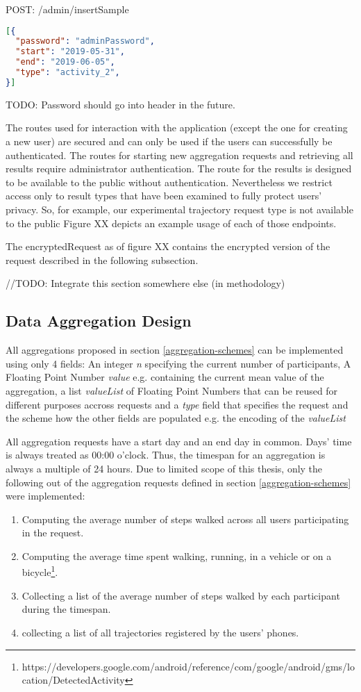 POST: /admin/insertSample
\begin{lstlisting}[language=json,firstnumber=1]
[{
  "password": "adminPassword",
  "start": "2019-05-31",
  "end": "2019-06-05",
  "type": "activity_2",
}]
\end{lstlisting}


TODO: Password should go into header in the future.

The routes used for interaction with the application (except the one for creating a new user) are secured and can only be used if the users can successfully be authenticated. The routes for starting new aggregation requests and retrieving all results require administrator authentication. The route for the results is designed to be available to the public without authentication. Nevertheless we restrict access only to result types that have been examined to fully protect users' privacy. So, for example, our experimental trajectory request type is not available to the public
Figure XX depicts an example usage of each of those endpoints.

The encryptedRequest as of figure XX contains the encrypted version of the request described in the following subsection.

//TODO: Integrate this section somewhere else (in methodology)
\subsection{Data Aggregation Design}
All aggregations proposed in section \ref{aggregation-schemes} can be implemented using only 4 fields: An integer \textit{n} specifying the current number of participants, A Floating Point Number \textit{value} e.g. containing the current mean value of the aggregation, a list \textit{valueList} of Floating Point Numbers that can be reused for different purposes accross requests and a \textit{type} field that specifies the request and the scheme how the other fields are populated e.g. the encoding of the \textit{valueList}

All aggregation requests have a start day and an end day in common. Days' time is always treated as 00:00 o'clock. Thus, the timespan for an aggregation is always a multiple of 24 hours.
Due to limited scope of this thesis, only the following out of the aggregation requests defined in section \ref{aggregation-schemes} were implemented:
\begin{enumerate}
	\item Computing the average number of steps walked across all users participating in the request.
	\item Computing the average time spent walking, running, in a vehicle or on a bicycle\footnote{https://developers.google.com/android/reference/com/google/android/gms/location/DetectedActivity}.
	\item Collecting a list of the average number of steps walked by each participant during the timespan.
	\item collecting a list of all trajectories registered by the users' phones.
\end{enumerate}

